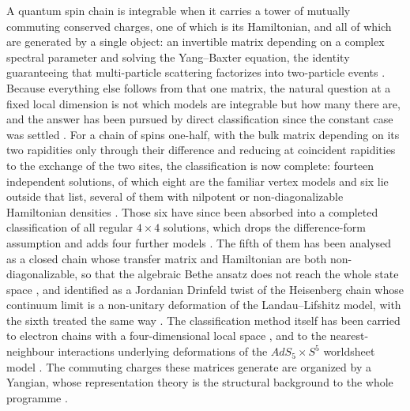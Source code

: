 \documentclass[11pt,reqno]{amsart}
\theoremstyle{plain}
\theoremstyle{definition}
\theoremstyle{remark}
\numberwithin{equation}{section}
\begin{document}
A quantum spin chain is integrable when it carries a tower of mutually commuting
conserved charges, one of which is its Hamiltonian, and all of which are
generated by a single object: an invertible matrix depending on a complex
spectral parameter and solving the Yang--Baxter equation, the identity
guaranteeing that multi-particle scattering factorizes into two-particle events
\cite{Yang_1967se,Baxter_1972pf,Takhtadzhan_1979tq}. Because everything else
follows from that one matrix, the natural question at a fixed local dimension is
not which models are integrable but how many there are, and the answer has been
pursued by direct classification since the constant case was settled
\cite{Kulish_1982so,Hietarinta_1993st,Vieira_2018sa,Retore_2022it}. For a chain
of spins one-half, with the bulk matrix depending on its two rapidities only
through their difference and reducing at coincident rapidities to the exchange
of the two sites, the classification is now complete: fourteen independent
solutions, of which eight are the familiar vertex models and six lie outside
that list, several of them with nilpotent or non-diagonalizable Hamiltonian
densities \cite{deLeeuw2019}. Those six have since been absorbed into a
completed classification of all regular $4\times4$ solutions, which drops the
difference-form assumption and adds four further models
\cite{Leeuw_2021yb,corcoran2024}. The fifth of them has been analysed as a closed
chain whose transfer matrix and Hamiltonian are both non-diagonalizable, so that
the algebraic Bethe ansatz does not reach the whole state space
\cite{nieto2024}, and identified as a Jordanian Drinfeld twist of the Heisenberg
chain whose continuum limit is a non-unitary deformation of the
Landau--Lifshitz model, with the sixth treated the same way \cite{deLeeuw2026}.
The classification method itself has been carried to electron chains with a
four-dimensional local space \cite{Leeuw_2020ni}, and to the nearest-neighbour
interactions underlying deformations of the $AdS_5\times S^5$ worldsheet
model \cite{Leeuw_2020cn}. The commuting charges these matrices generate are
organized by a Yangian, whose representation theory is the structural
background to the whole programme \cite{Loebbert_2016lo}.
\end{document}
